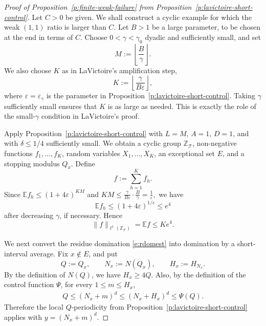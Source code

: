 \documentclass[12pt,leqno]{amsart}
\numberwithin{equation}{section}
\numberwithin{counter2}{section}
\theoremstyle{definition}
\theoremstyle{plain}
\begin{document}
\begin{proof}[Proof of Proposition~\ref{p:finite-weak-failure} from
	Proposition~\ref{p:lavictoire-short-control}]
	Let \(C>0\) be given. We shall construct a cyclic example for which the
	weak \((1,1)\) ratio is larger than \(C\).
	Let \(B>1\) be a large parameter, to be chosen at the end in terms of \(C\).
	Choose \(0<\gamma<\gamma_0\) dyadic and sufficiently small, and set
	\[
	M:=\left\lfloor \frac{B}{\gamma}\right\rfloor .
	\]
	We also choose \(K\) as in LaVictoire's amplification step,
	\[
	K:=\left\lfloor \frac{\gamma}{B\varepsilon}\right\rfloor ,
	\]
	where \(\varepsilon=\varepsilon_\gamma\) is the parameter in
	Proposition~\ref{p:lavictoire-short-control}. Taking \(\gamma\) sufficiently
	small ensures that \(K\) is as large as needed. This is exactly the role of the
	small-\(\gamma\) condition in LaVictoire's proof.
	
	Apply Proposition~\ref{p:lavictoire-short-control} with \(L=M\), \(A=1\),
	\(D=1\), and with \(\delta\le 1/4\) sufficiently small. We obtain a cyclic group
	\(\mathbb Z_{\mathcal T}\), non-negative functions \(f_1,\dots,f_K\), random
	variables \(X_1,\dots,X_K\), an exceptional set \(E\), and a stopping modulus
	\(Q_x\). Define
	\[
	f:=\sum_{h=1}^K f_h .
	\]
	Since $\mathbb E f_h\leq (1+4\varepsilon)^{KM}$ and $KM
	\leq
	\frac{\gamma}{B\varepsilon}\cdot \frac{B}{\gamma}
	=
	\frac1{\varepsilon},$
	we have
	\[
	\mathbb E f_h
	\leq
	(1+4\varepsilon)^{1/\varepsilon}
	\leq e^4
	\]
	after decreasing \(\gamma\), if necessary. Hence
	\[
	\|f\|_{\ell^1(\mathbb Z_{\mathcal T})}
	=
	\mathbb E f
	\leq
	K e^4 .
	\]
	
We next convert the residue domination \eqref{e:rdomest} into domination by a
short-interval average. Fix \(x\notin E\), and put
\[
Q:=Q_x,
\qquad
N_x:=N(Q_x),
\qquad
H_x:=H_{N_x}.
\]
By the definition of \(N(Q)\), we have \(H_x\geq 4Q\). Also, by the definition
of the control function \(\Psi\), for every \(1\leq m\leq H_x\),
\begin{align}\label{e:sizeofQpsi}
    Q
\leq
(N_x+m)^d
\leq
(N_x+H_x)^d
\leq
\Psi(Q).
\end{align}
Therefore the local \(Q\)-periodicity from
Proposition~\ref{p:lavictoire-short-control} applies with $y=(N_x+m)^d .$


\end{proof}
\end{document}
